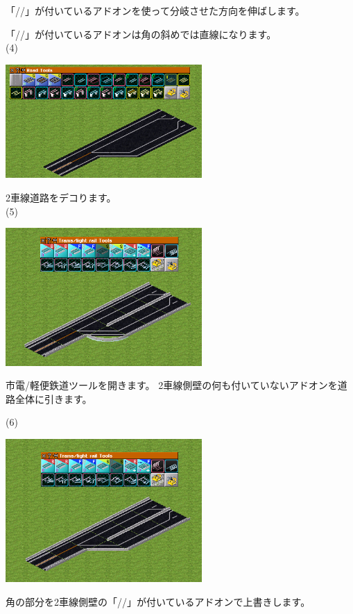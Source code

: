 \documentclass{jbook}
\begin{document}
\begin{multicols}{2}
「//」が付いているアドオンを使って分岐させた方向を伸ばします。

「//」が付いているアドオンは角の斜めでは直線になります。\\


(4)

\includegraphics[width = 75mm]{picture/20210214-road-3-4.png}

2車線道路をデコります。\\

\newpage
(5)

\includegraphics[width = 75mm]{picture/20210214-road-3-5.png}

市電/軽便鉄道ツールを開きます。
2車線側壁の何も付いていないアドオンを道路全体に引きます。


(6)

\includegraphics[width = 75mm]{picture/20210214-road-3-6.png}

角の部分を2車線側壁の「//」が付いているアドオンで上書きします。

\end{multicols}
\end{document}

